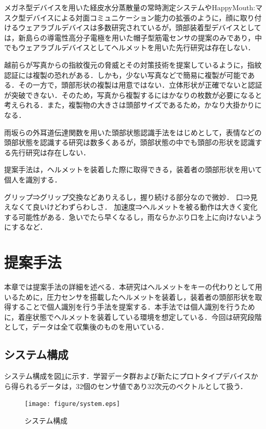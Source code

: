 \documentclass[Japanese]{dicomopapers}
\begin{document}
メガネ型デバイスを用いた経皮水分蒸散量の常時測定システム\cite{glasses}やHappyMouth:マスク型デバイスによる対面コミュニケーション能力の拡張\cite{happymouth}のように，顔に取り付けるウェアラブルデバイスは多数研究されているが，頭部装着型デバイスとしては，新島らの導電性高分子電極を用いた帽子型筋電センサの提案\cite{cap_sensor}のみであり，中でもウェアラブルデバイスとしてヘルメットを用いた先行研究は存在しない．

越前らが写真からの指紋復元の脅威とその対策技術\cite{finger_print}を提案しているように，指紋認証には複製の恐れがある．しかも，少ない写真などで簡易に複製が可能である．その一方で，頭部形状の複製は用意ではない．立体形状が正確でないと認証が突破できない．そのため，写真から複製するにはかなりの枚数が必要になると考えられる．また，複製物の大きさは頭部サイズであるため，かなり大掛かりになる．

雨坂らの外耳道伝達関数を用いた頭部状態認識手法\cite{head_from_ear}をはじめとして，表情などの頭部状態を認識する研究は数多くあるが，頭部状態の中でも頭部の形状を認識する先行研究は存在しない．



提案手法は，ヘルメットを装着した際に取得できる，装着者の頭部形状を用いて個人を識別する．

グリップ⇒グリップ交換などありえるし，握り続ける部分なので微妙．
口⇒見えなくて良いけどわずらわしさ．
加速度⇒ヘルメットを被る動作は大きく変化する可能性がある．急いでたら早くなるし，雨ならかぶり口を上に向けないようにするなど．

\section{提案手法}
本章では提案手法の詳細を述べる．本研究はヘルメットをキーの代わりとして用いるために，圧力センサを搭載したヘルメットを装着し，装着者の頭部形状を取得することで個人識別を行う手法を提案する．本手法では個人識別を行うために，着座状態でヘルメットを装着している環境を想定している．今回は研究段階として，データは全て収集後のものを用いている．

\subsection{システム構成}
システム構成を図\ref{system}に示す．学習データ群および新たにプロトタイプデバイスから得られるデータは，32個のセンサ値であり32次元のベクトルとして扱う．\par

\begin{figure}[!t]
  \begin{center}
    \texttt{[image: figure/system.eps]}
  \end{center}
  \caption{システム構成}
  \label{system}
\end{figure}
\end{document}

